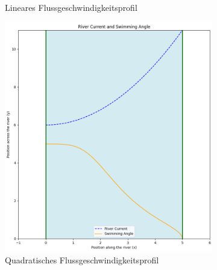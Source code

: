 \begin{figure}
\begin{subfigure}{0.48\textwidth}
        \caption{Lineares Flussgeschwindigkeitsprofil}
        \label{fig:diagonal_velocity}
    \end{subfigure}
    \par\bigskip
    \begin{subfigure}{0.48\textwidth}
        \centering
        \includegraphics[width=\textwidth]{Grafiken/squard-crop.png}	
        \caption{Quadratisches Flussgeschwindigkeitsprofil}
        \label{fig:squerd_velocity}
    \end{subfigure}
    \hfill  
    \begin{subfigure}{0.48\textwidth}
        \centering

\end{subfigure}
\end{figure}
